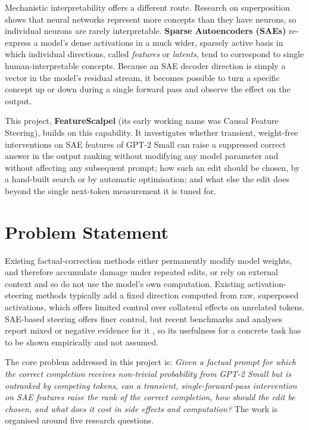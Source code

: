 \documentclass[12pt,a4paper]{report}
\begin{document}
Mechanistic interpretability offers a different route. Research on superposition \cite{r5} shows that neural networks represent more concepts than they have neurons, so individual neurons are rarely interpretable. \textbf{Sparse Autoencoders (SAEs)} \cite{r6,r7} re-express a model's dense activations in a much wider, sparsely active basis in which individual directions, called \textit{features} or \textit{latents}, tend to correspond to single human-interpretable concepts. Because an SAE decoder direction is simply a vector in the model's residual stream, it becomes possible to turn a specific concept up or down during a single forward pass and observe the effect on the output.

This project, \textbf{FeatureScalpel} (its early working name was Causal Feature Steering), builds on this capability. It investigates whether transient, weight-free interventions on SAE features of GPT-2 Small \cite{r1} can raise a suppressed correct answer in the output ranking without modifying any model parameter and without affecting any subsequent prompt; how such an edit should be chosen, by a hand-built search or by automatic optimisation; and what else the edit does beyond the single next-token measurement it is tuned for.

\section{Problem Statement}

Existing factual-correction methods either permanently modify model weights, and therefore accumulate damage under repeated edits, or rely on external context and so do not use the model's own computation. Existing activation-steering methods typically add a fixed direction computed from raw, superposed activations, which offers limited control over collateral effects on unrelated tokens. SAE-based steering offers finer control, but recent benchmarks and analyses report mixed or negative evidence for it \cite{r12,r24,r25,r26}, so its usefulness for a concrete task has to be shown empirically and not assumed.

The core problem addressed in this project is: \textit{Given a factual prompt for which the correct completion receives non-trivial probability from GPT-2 Small but is outranked by competing tokens, can a transient, single-forward-pass intervention on SAE features raise the rank of the correct completion, how should the edit be chosen, and what does it cost in side effects and computation?} The work is organised around five research questions.
\end{document}
